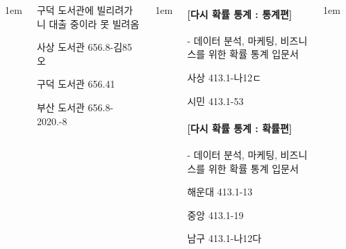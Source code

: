 \documentclass[	20pt, 
							a1paper, 
							portrait, %
							margin=0mm, %
							innermargin=10mm,  		%
							colspace=5mm, 
							subcolspace=0mm
							]{tikzposter}
\begin{document}
\begin{columns}
			{
					\setlength{\leftmargini}{4em}
					\setlength{\labelsep} {1em}
				\begin{LARGE}
구덕 도서관에 빌리려가니 대출 중이라 못 빌려옴

사상 도서관  656.8-김85오  %

구덕 도서관  656.41  %

부산 도서관  656.8-2020.-8  %
				\end{LARGE}
			}






			{
					\setlength{\leftmargini}{4em}
					\setlength{\labelsep} {1em}
				\begin{LARGE}

\paragraph{[다시 확률 통계 : 통계편]}
 - 데이터 분석, 마케팅, 비즈니스를 위한 확률 통계 입문서

사상    413.1-나12ㄷ

시민   413.1-53


\paragraph{[다시 확률 통계 : 확률편]}
 - 데이터 분석, 마케팅, 비즈니스를 위한 확률 통계 입문서

해운대  413.1-13

중앙   413.1-19

남구  413.1-나12다  


				\end{LARGE}
			} %




			{
					\setlength{\leftmargini}{4em}
					\setlength{\labelsep} {1em}
				\begin{LARGE}




\end{LARGE}}
\end{columns}
\end{document}
